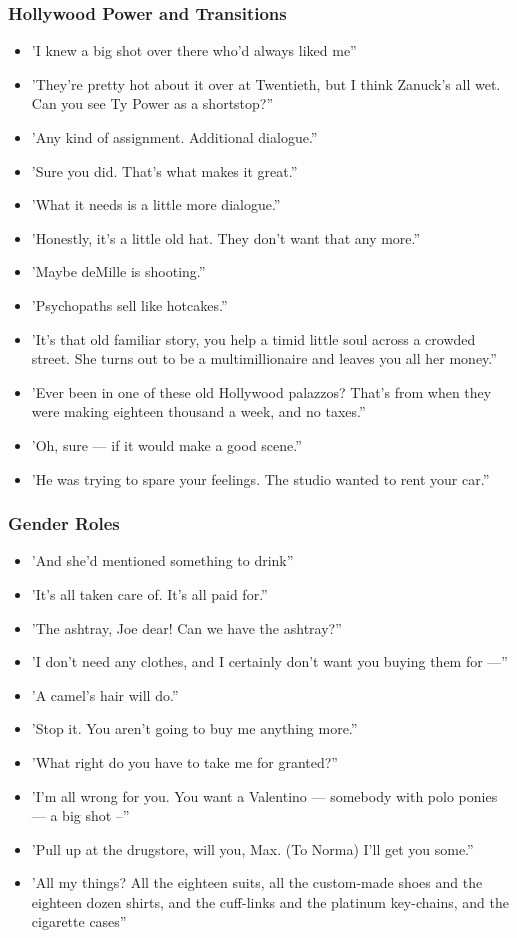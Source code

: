 \documentclass[a4paper]{article}
\begin{document}
\subsubsection{Hollywood Power and Transitions}
\begin{itemize}
\item 'I knew a big shot over there who’d always liked me”
\item 'They're pretty hot about it over at Twentieth, but I think Zanuck's all wet. Can you see Ty Power as a shortstop?”
\item 'Any kind of assignment. Additional dialogue.”
\item 'Sure you did. That's what makes it great.”
\item 'What it needs is a little more dialogue.”
\item 'Honestly, it's a little old hat. They don't want that any more.”
\item 'Maybe deMille is shooting.”
\item 'Psychopaths sell like hotcakes.”
\item 'It's that old familiar story, you help a timid little soul across a crowded street. She turns out to be a multimillionaire and leaves you all her money.”
\item 'Ever been in one of these old Hollywood palazzos? That's from when they were making eighteen thousand a week, and no taxes.”
\item 'Oh, sure — if it would make a good scene.”
\item 'He was trying to spare your feelings. The studio wanted to rent your car.”
\end{itemize}


\subsubsection{Gender Roles}

\begin{itemize}
\item 'And she’d mentioned something to drink”
\item 'It's all taken care of. It's all paid for.”
\item 'The ashtray, Joe dear! Can we have the ashtray?”
\item 'I don't need any clothes, and I certainly don't want you buying them for —”
\item 'A camel's hair will do.”
\item 'Stop it. You aren't going to buy me anything more.”
\item 'What right do you have to take me for granted?”
\item 'I'm all wrong for you. You want a Valentino — somebody with polo ponies — a big shot –”
\item 'Pull up at the drugstore, will you, Max. (To Norma) I'll get you some.”
\item 'All my things? All the eighteen suits, all the custom-made shoes and the eighteen dozen shirts, and the cuff-links and the platinum key-chains, and the cigarette cases”
\end{itemize}
\end{document}
